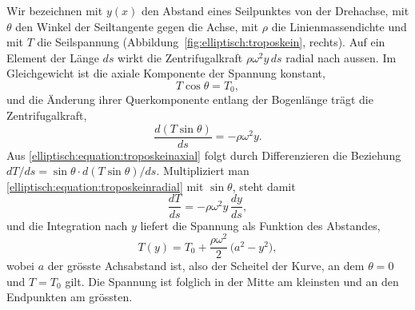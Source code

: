 Wir bezeichnen mit $y(x)$ den Abstand eines Seilpunktes von der
Drehachse, mit $\theta$ den Winkel der Seiltangente gegen die
Achse, mit $\rho$ die Linienmassendichte und mit $T$ die
Seilspannung (Abbildung~\ref{fig:elliptisch:troposkein}, rechts).
Auf ein Element der Länge $ds$ wirkt die Zentrifugalkraft
$\rho\omega^2 y\,ds$ radial nach aussen.
Im Gleichgewicht ist die axiale Komponente der Spannung konstant,
\begin{equation}
T\cos\theta = T_0,
\label{elliptisch:equation:troposkeinaxial}
\end{equation}
und die Änderung ihrer Querkomponente entlang der Bogenlänge trägt
die Zentrifugalkraft,
\begin{equation}
\frac{d(T\sin\theta)}{ds}
=
-\rho\omega^2 y.
\label{elliptisch:equation:troposkeinradial}
\end{equation}
Aus \eqref{elliptisch:equation:troposkeinaxial} folgt durch
Differenzieren die Beziehung
$dT/ds = \sin\theta \cdot d(T\sin\theta)/ds$.
Multipliziert man \eqref{elliptisch:equation:troposkeinradial} mit
$\sin\theta$, steht damit
\begin{equation}
\frac{dT}{ds}
=
-\rho\omega^2 y\,\frac{dy}{ds},
\label{elliptisch:equation:troposkeinintegration}
\end{equation}
und die Integration nach $y$ liefert
die Spannung als Funktion des Abstandes,
\begin{equation}
T(y)
=
T_0 + \frac{\rho\omega^2}{2}\,\bigl(a^2 - y^2\bigr),
\label{elliptisch:equation:troposkeinspannung}
\end{equation}
wobei $a$ der grösste Achsabstand ist, also der Scheitel der Kurve,
an dem $\theta = 0$ und $T = T_0$ gilt.
Die Spannung ist folglich in der Mitte am kleinsten und an den
Endpunkten am grössten.

